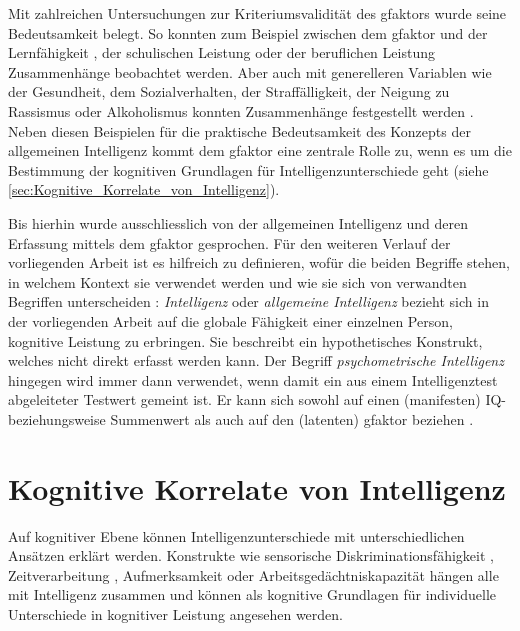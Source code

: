 \documentclass[11pt, twoside, a4paper]{book}		%
\begin{document}
Mit zahlreichen Untersuchungen zur Kriteriumsvalidität des \gls{gfaktor}s wurde seine Bedeutsamkeit belegt. So konnten zum Beispiel zwischen dem \gls{gfaktor} und der Lernfähigkeit \citep{Christal1991}, der schulischen Leistung \citep{Jensen1998a} oder der beruflichen Leistung \citep{Schmidt2004} Zusammenhänge beobachtet werden. Aber auch mit generelleren Variablen wie der Gesundheit, dem Sozialverhalten, der Straffälligkeit, der Neigung zu Rassismus oder Alkoholismus konnten Zusammenhänge festgestellt werden \citep[für eine Übersicht siehe][]{Brand1987}. 
Neben diesen Beispielen für die praktische Bedeutsamkeit des Konzepts der allgemeinen Intelligenz kommt dem \gls{gfaktor} eine zentrale Rolle zu, wenn es um die Bestimmung der kognitiven Grundlagen für Intelligenzunterschiede geht (siehe \autoref{sec:Kognitive_Korrelate_von_Intelligenz}).

Bis hierhin wurde ausschliesslich von der allgemeinen Intelligenz und deren Erfassung mittels dem \gls{gfaktor} gesprochen. Für den weiteren Verlauf der vorliegenden Arbeit ist es hilfreich zu definieren, wofür die beiden Begriffe stehen, in welchem Kontext sie verwendet werden und wie sie sich von verwandten Begriffen unterscheiden \citep[für eine ähnliche Begriffsverwendung siehe][]{Rabaglia2011}:
\textit{Intelligenz} oder \textit{allgemeine Intelligenz} bezieht sich in der vorliegenden Arbeit auf die globale Fähigkeit einer einzelnen Person, kognitive Leistung zu erbringen. Sie beschreibt ein hypothetisches Konstrukt, welches nicht direkt erfasst werden kann.
Der Begriff \textit{psychometrische Intelligenz} hingegen wird immer dann verwendet, wenn damit ein aus einem Intelligenztest abgeleiteter Testwert gemeint ist. Er kann sich sowohl auf einen (manifesten) IQ- beziehungsweise Summenwert als auch auf den (latenten) \gls{gfaktor} beziehen \citep[die beiden Werte sind stark korreliert, siehe][S. 90]{Jensen1998a}.



\section{Kognitive Korrelate von Intelligenz \label{sec:Kognitive_Korrelate_von_Intelligenz}}

Auf kognitiver Ebene können Intelligenzunterschiede mit unterschiedlichen Ansätzen erklärt werden. Konstrukte wie sensorische Diskriminationsfähigkeit \citep[z.~B.][]{Galton1883, Spearman1904, Deary2004, Meyer2010}, Zeitverarbeitung \citep[z.~B.][]{Rammsayer2002}, Aufmerksamkeit \citep[z.~B.][]{Schweizer2004} oder Arbeitsgedächtniskapazität \citep[für eine Metaanalyse siehe][]{Ackerman2005} hängen alle mit Intelligenz zusammen und können als kognitive Grundlagen für individuelle Unterschiede in kognitiver Leistung angesehen werden. 
\end{document}
